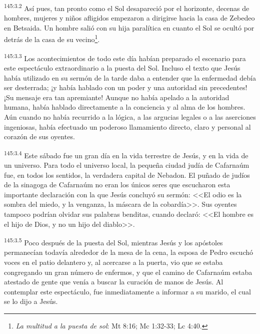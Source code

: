 \par 
\textsuperscript{145:3.2} Así pues, tan pronto como el Sol desapareció por el horizonte, decenas de hombres, mujeres y niños afligidos empezaron a dirigirse hacia la casa de Zebedeo en Betsaida. Un hombre salió con su hija paralítica en cuanto el Sol se ocultó por detrás de la casa de su vecino\footnote{\textit{La multitud a la puesta de sol}: Mt 8:16; Mc 1:32-33; Lc 4:40.}.

\par 
\textsuperscript{145:3.3} Los acontecimientos de todo este día habían preparado el escenario para este espectáculo extraordinario a la puesta del Sol. Incluso el texto que Jesús había utilizado en su sermón de la tarde daba a entender que la enfermedad debía ser desterrada; ¡y había hablado con un poder y una autoridad sin precedentes! ¡Su mensaje era tan apremiante! Aunque no había apelado a la autoridad humana, había hablado directamente a la conciencia y al alma de los hombres. Aún cuando no había recurrido a la lógica, a las argucias legales o a las aserciones ingeniosas, había efectuado un poderoso llamamiento directo, claro y personal al corazón de sus oyentes.

\par 
\textsuperscript{145:3.4} Este sábado fue un gran día en la vida terrestre de Jesús, y en la vida de un universo. Para todo el universo local, la pequeña ciudad judía de Cafarnaúm fue, en todos los sentidos, la verdadera capital de Nebadon. El puñado de judíos de la sinagoga de Cafarnaúm no eran los únicos seres que escucharon esta importante declaración con la que Jesús concluyó su sermón: <<El odio es la sombra del miedo, y la venganza, la máscara de la cobardía>>. Sus oyentes tampoco podrían olvidar sus palabras benditas, cuando declaró: <<El hombre es el hijo de Dios, y no un hijo del diablo>>.

\par 
\textsuperscript{145:3.5} Poco después de la puesta del Sol, mientras Jesús y los apóstoles permanecían todavía alrededor de la mesa de la cena, la esposa de Pedro escuchó voces en el patio delantero y, al acercarse a la puerta, vio que se estaba congregando un gran número de enfermos, y que el camino de Cafarnaúm estaba atestado de gente que venía a buscar la curación de manos de Jesús. Al contemplar este espectáculo, fue inmediatamente a informar a su marido, el cual se lo dijo a Jesús.

